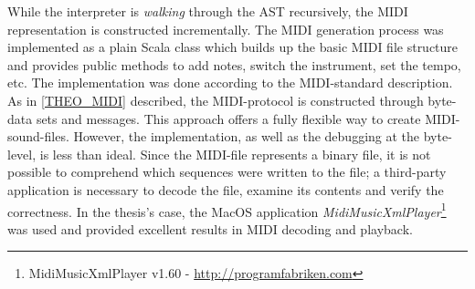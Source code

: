 While the interpreter is \textit{walking} through the AST recursively, the MIDI representation is constructed incrementally. The MIDI generation process was implemented as a plain Scala class which builds up the basic MIDI file structure and provides public methods to add notes, switch the instrument, set the tempo, etc. The implementation was done according to the MIDI-standard description.\cite{MIDIManufacturersAssociation} As in \ref{THEO_MIDI} described, the MIDI-protocol is constructed through byte-data sets and messages. This approach offers a fully flexible way to create MIDI-sound-files. However, the implementation, as well as the debugging at the byte-level, is less than ideal. Since the MIDI-file represents a binary file, it is not possible to comprehend which sequences were written to the file; a third-party application is necessary to decode the file, examine its contents and verify the correctness. In the thesis's case, the MacOS application \textit{MidiMusicXmlPlayer}\footnote{MidiMusicXmlPlayer v1.60 - \url{http://programfabriken.com}} was used and provided excellent results in MIDI decoding and playback.













